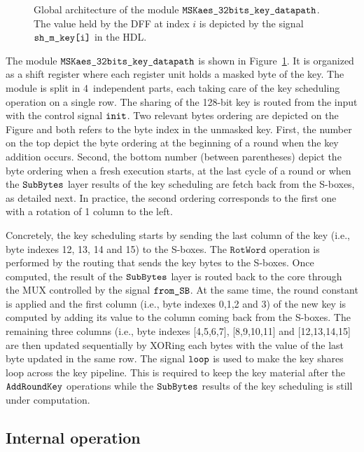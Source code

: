 \documentclass{scrartcl}
\begin{document}
\begin{figure}
    \centering
    \resizebox{\textwidth}{!}{
        \begin{tikzpicture}
            
        \end{tikzpicture}
    }
    \caption{Global architecture of the module $\texttt{MSKaes\_32bits\_key\_datapath}$. The value held by the DFF at index $i$ is depicted by the signal $\texttt{sh\_m\_key[i]}$ in the HDL.}
    \label{fig:aes_dpKey}
\end{figure}

The module $\texttt{MSKaes\_32bits\_key\_datapath}$ is shown in Figure~\ref{fig:aes_dpKey}. It is
organized as a shift register where each register unit holds a masked byte of
the key. The module is split in 4~independent parts, each taking care of the
key scheduling operation on a single row. The sharing of the 128-bit key is
routed from the input with the control signal $\texttt{init}$. Two relevant
bytes ordering are depicted on the Figure and both refers to the byte index in
the unmasked key. First, the number on the top depict the byte ordering at the
beginning of a round when the key addition occurs. Second, the bottom number
(between parentheses) depict the byte ordering when a fresh execution starts,
at the last cycle of a round or when the $\texttt{SubBytes}$ layer results of the key
scheduling are fetch back from the S-boxes, as detailed next. In practice, the
second ordering corresponds to the first one with a rotation of 1 column to the
left.

Concretely, the key scheduling starts by sending the last column of the key
(i.e., byte indexes 12, 13, 14 and 15) to the S-boxes.  The $\texttt{RotWord}$
operation is performed by the routing that sends the key bytes to the S-boxes.
Once computed, the result of the $\texttt{SubBytes}$ layer is routed back to the core through
the MUX controlled by the signal $\texttt{from\_SB}$.  At the same time,
the round constant is applied and the first column (i.e., byte indexes 0,1,2
and 3) of the new key is computed by adding its value to the column coming back
from the S-boxes.  The remaining three columns (i.e., byte indexes [4,5,6,7],
[8,9,10,11] and [12,13,14,15] are then updated sequentially by XORing each
bytes with the value of the last byte updated in the same row. The signal
$\texttt{loop}$ is used to make the key shares loop across the key pipeline.
This is required to keep the key material after the $\texttt{AddRoundKey}$ operations while the
$\texttt{SubBytes}$ results of the key scheduling is still under computation. 

\subsection{Internal operation}
\end{document}
